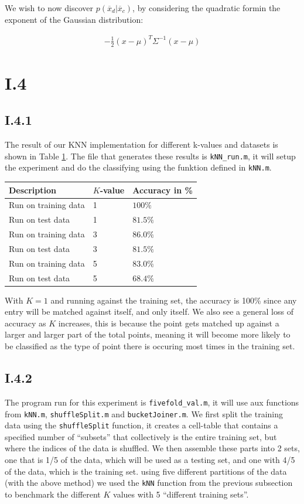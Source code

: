 We wish to now discover $p(\overline{x}_d | \overline{x}_c)$, by considering
the quadratic formin the exponent of the Gaussian distribution:

\begin{align}
	-\frac{1}{2} (x - \mu)^T \Sigma^{-1}(x - \mu)
\end{align}


\section{I.4}
\subsection{I.4.1}
The result of our KNN implementation for different k-values and datasets is
shown in Table \ref{tab:knn-results}. The file that generates these results is
\texttt{kNN_run.m}, it will setup the experiment and do the classifying using
the funktion defined in \texttt{kNN.m}.
\begin{table}
\begin{tabular}{|l|l|l|}
\hline
Description          & $K$-value & Accuracy in \% \\\hline
Run on training data & 1         & $100  \%$ \\
Run on test data     & 1         & $81.5 \%$ \\
Run on training data & 3         & $86.0 \%$ \\
Run on test data     & 3         & $81.5 \%$ \\
Run on training data & 5         & $83.0 \%$ \\
Run on test data     & 5         & $68.4 \%$
\end{tabular}
\label{tab:knn-results}
\end{table}

With $K=1$ and running against the training set, the accuracy is 100\% since any
entry will be matched against itself, and only itself. We also see a general
loss of accuracy as $K$ increases, this is because the point gets matched up
against a larger and larger part of the total points, meaning it will become
more likely to be classified as the type of point there is occuring most times
in the training set.


\subsection{I.4.2}
The program run for this experiment is \texttt{fivefold_val.m}, it will use aux
functions from \texttt{kNN.m}, \texttt{shuffleSplit.m} and
\texttt{bucketJoiner.m}. We first split the training data using the
\texttt{shuffleSplit} function, it creates a cell-table that contains a
specified number of ``subsets'' that collectively is the entire training set,
but where the indices of the data is shuffled. We then assemble these parts into
2 sets, one that is 1/5 of the data, which will be used as a testing set, and
one with 4/5 of the data, which is the training set.  using five different
partitions of the data (with the above method) we used the \texttt{kNN} function
from the previous subsection to benchmark the different $K$ values with 5
``different training sets''.

